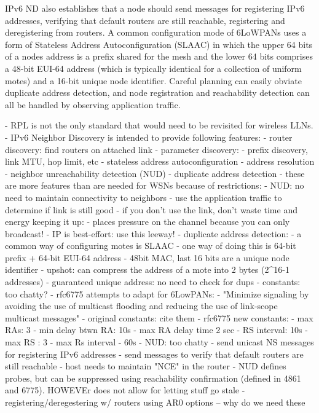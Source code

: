 IPv6 ND also establishes that a node should send messages for registering IPv6 addresses, verifying that default routers are still reachable, registering and deregistering from routers.
A common configuration mode of 6LoWPANs uses a form of Stateless Address Autoconfiguration (SLAAC) in which the upper 64 bits of a nodes address is a prefix shared for the mesh and the lower 64 bits comprises a 48-bit EUI-64 address (which is typically identical for a collection of uniform motes) and a 16-bit unique node identifier.
Careful planning can easily obviate duplicate address detection, and node registration and reachability detection can all be handled by observing application traffic.

- RPL is not the only standard that would need to be revisited for wireless LLNs.
- IPv6 Neighbor Discovery is intended to provide following features:
    - router discovery: find routers on attached link
    - parameter discovery:
        - prefix discovery, link MTU, hop limit, etc
    - stateless address autoconfiguration
    - address resolution
    - neighbor unreachability detection (NUD)
    - duplicate address detection
- these are more features than are needed for WSNs because of restrictions:
    - NUD: no need to maintain connectivity to neighbors
        - use the application traffic to determine if link is still good
        - if you don't use the link, don't waste time and energy keeping it up:
            - places pressure on the channel because you can only broadcast!
        - IP is best-effort: use this leeway!
    - duplicate address detection:
        - a common way of configuring motes is SLAAC
        - one way of doing this is 64-bit prefix + 64-bit EUI-64 address
        - 48bit MAC, last 16 bits are a unique node identifier
        - upshot: can compress the address of a mote into 2 bytes (2^16-1 addresses)
        - guaranteed unique address: no need to check for dups
- constants: too chatty?
    - rfc6775 attempts to adapt for 6LowPANs:
    - "Minimize signaling by avoiding the use of multicast
      flooding and reducing the use of link-scope multicast messages"
    - original constants: cite them
    - rfc6775 new constants:
        - max RAs: 3
        - min delay btwn RA: 10s
        - max RA delay time 2 sec
        - RS interval: 10s
        - max RS : 3
        - max Rs interval - 60s
- NUD: too chatty
    - send unicast NS messages for registering IPv6 addresses
    - send messages to verify that default routers are still reachable
    - host needs to maintain "NCE" in the router
    - NUD defines probes, but can be suppressed using reachability confirmation
      (defined in 4861 and 6775). HOWEVEr does not allow for letting stuff go stale
    - registering/deregestering w/ routers using AR0 options -- why do we need these
\fi
